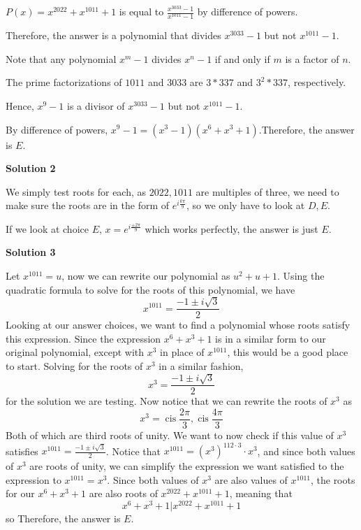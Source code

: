 \begin{enumerate}
$P(x) = x^{2022} + x^{1011} + 1$ is equal to $\frac{x^{3033}-1}{x^{1011}-1}$ by difference of powers.

 Therefore, the answer is a polynomial that divides $x^{3033}-1$ but not $x^{1011}-1$.

 Note that any polynomial $x^m-1$ divides $x^n-1$ if and only if $m$ is a factor of $n$.

 The prime factorizations of $1011$ and $3033$ are $3*337$ and $3^2*337$, respectively.

 Hence, $x^9-1$ is a divisor of $x^{3033}-1$ but not $x^{1011}-1$.

 By difference of powers, $x^9-1=(x^3-1)(x^6+x^3+1)$.Therefore, the answer is $\boxed{E}$.

 



\textbf{Solution 2}

We simply test roots for each, as $2022,1011$ are multiples of three, we need to make sure the roots are in the form of $e^{i\frac{k\pi}{9}}$, so we only have to look at $D,E$.

 If we look at choice $E$, $x=e^{i\frac{\pm2\pi}{9}}$ which works perfectly, the answer is just $E$.

 



\textbf{Solution 3}

Let $x^{1011} = u$, now we can rewrite our polynomial as $u^2+u+1$. Using the quadratic formula to solve for the roots of this polynomial, we have 
 \[x^{1011} = \frac{-1\pm i\sqrt{3}}{2}\] Looking at our answer choices, we want to find a polynomial whose roots satisfy this expression. Since the expression $x^6+x^3+1$ is in a similar form to our original polynomial, except with $x^3$ in place of $x^{1011}$, this would be a good place to start. Solving for the roots of $x^3$ in a similar fashion, 
 \[x^3= \frac{-1\pm i\sqrt{3}}{2}\] for the solution we are testing. Now notice that we can rewrite the roots of $x^3$ as 
 \[x^3 = \operatorname{cis}{\frac{2\pi}{3}}, \operatorname{cis}{\frac{4\pi}{3}}\] Both of which are third roots of unity. We want to now check if this value of $x^3$ satisfies $x^{1011} = \frac{-1\pm i\sqrt{3}}{2}$. Notice that $x^{1011} = (x^{3})^{112\cdot3}\cdot x^3$, and since both values of $x^3$ are roots of unity, we can simplify the expression we want satisfied to the expression to $x^{1011}=x^3$. Since both values of $x^3$ are also values of $x^{1011}$, the roots for our $x^6+x^3+1$ are also roots of $x^{2022}+x^{1011}+1$, meaning that 
 \[x^6+x^3+1 | x^{2022}+x^{1011}+1\] so Therefore, the answer is $\boxed{E}$.


\end{enumerate}
